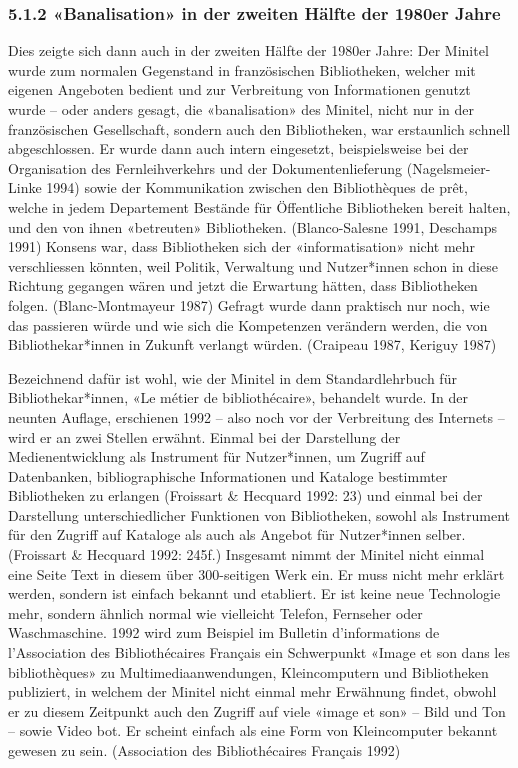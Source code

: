 \documentclass[a4paper,
fontsize=11pt,
oneside,
numbers=noperiodatend,
parskip=half-,
bibliography=totoc,
final
]{scrartcl}
\begin{document}
\hypertarget{banalisation-in-der-zweiten-huxe4lfte-der-1980er-jahre}{%
\subsubsection{5.1.2 «Banalisation» in der zweiten Hälfte der 1980er
Jahre}\label{banalisation-in-der-zweiten-huxe4lfte-der-1980er-jahre}}

Dies zeigte sich dann auch in der zweiten Hälfte der 1980er Jahre: Der
Minitel wurde zum normalen Gegenstand in französischen Bibliotheken,
welcher mit eigenen Angeboten bedient und zur Verbreitung von
Informationen genutzt wurde -- oder anders gesagt, die «banalisation»
des Minitel, nicht nur in der französischen Gesellschaft, sondern auch
den Bibliotheken, war erstaunlich schnell abgeschlossen. Er wurde dann
auch intern eingesetzt, beispielsweise bei der Organisation des
Fernleihverkehrs und der Dokumentenlieferung (Nagelsmeier-Linke 1994)
sowie der Kommunikation zwischen den Bibliothèques de prêt, welche in
jedem Departement Bestände für Öffentliche Bibliotheken bereit halten,
und den von ihnen «betreuten» Bibliotheken. (Blanco-Salesne 1991,
Deschamps 1991) Konsens war, dass Bibliotheken sich der
«informatisation» nicht mehr verschliessen könnten, weil Politik,
Verwaltung und Nutzer*innen schon in diese Richtung gegangen wären und
jetzt die Erwartung hätten, dass Bibliotheken folgen. (Blanc-Montmayeur
1987) Gefragt wurde dann praktisch nur noch, wie das passieren würde und
wie sich die Kompetenzen verändern werden, die von Bibliothekar*innen in
Zukunft verlangt würden. (Craipeau 1987, Keriguy 1987)

Bezeichnend dafür ist wohl, wie der Minitel in dem Standardlehrbuch für
Bibliothekar*innen, «Le métier de bibliothécaire», behandelt wurde. In
der neunten Auflage, erschienen 1992 -- also noch vor der Verbreitung
des Internets -- wird er an zwei Stellen erwähnt. Einmal bei der
Darstellung der Medienentwicklung als Instrument für Nutzer*innen, um
Zugriff auf Datenbanken, bibliographische Informationen und Kataloge
bestimmter Bibliotheken zu erlangen (Froissart \& Hecquard 1992: 23) und
einmal bei der Darstellung unterschiedlicher Funktionen von
Bibliotheken, sowohl als Instrument für den Zugriff auf Kataloge als
auch als Angebot für Nutzer*innen selber. (Froissart \& Hecquard 1992:
245f.) Insgesamt nimmt der Minitel nicht einmal eine Seite Text in
diesem über 300-seitigen Werk ein. Er muss nicht mehr erklärt werden,
sondern ist einfach bekannt und etabliert. Er ist keine neue Technologie
mehr, sondern ähnlich normal wie vielleicht Telefon, Fernseher oder
Waschmaschine. 1992 wird zum Beispiel im Bulletin d'informations de
l'Association des Bibliothécaires Français ein Schwerpunkt «Image et son
dans les bibliothèques» zu Multimediaanwendungen, Kleincomputern und
Bibliotheken publiziert, in welchem der Minitel nicht einmal mehr
Erwähnung findet, obwohl er zu diesem Zeitpunkt auch den Zugriff auf
viele «image et son» -- Bild und Ton -- sowie Video bot. Er scheint
einfach als eine Form von Kleincomputer bekannt gewesen zu sein.
(Association des Bibliothécaires Français 1992)
\end{document}
